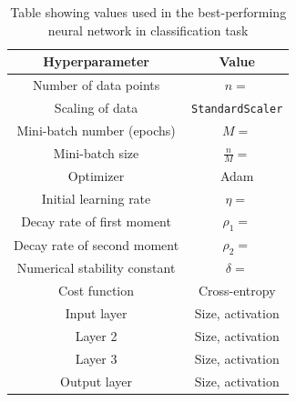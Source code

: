 \begin{table}[h!]
  \centering
  \small
  \begin{tabular}{|c|c|}
    \hline
    \textbf{Hyperparameter} & \textbf{Value} \\
    \hline
    Number of data points & $n = $ \\
    \hline
    Scaling of data & \texttt{StandardScaler} \\
    \hline
    Mini-batch number (epochs) & $M = $ \\
    \hline
    Mini-batch size & $\frac{n}{M} = $ \\
    \hline
    Optimizer & Adam \\
    \hline
    Initial learning rate & $\eta = $ \\
    \hline
    Decay rate of first moment & $\rho_1 =$ \\
    \hline
    Decay rate of second moment & $\rho_2 = $ \\
    \hline
    Numerical stability constant & $\delta = $ \\
    \hline
    Cost function & Cross-entropy \\
    \hline
    Input layer & Size, activation \\
    \hline
    Layer 2 & Size, activation \\
    \hline
    Layer 3 & Size, activation \\
    \hline
    Output layer & Size, activation \\
    \hline
  \end{tabular}
  \caption{Table showing values used in the best-performing neural network in classification task}
  \label{tab:classificationtask}
\end{table}


